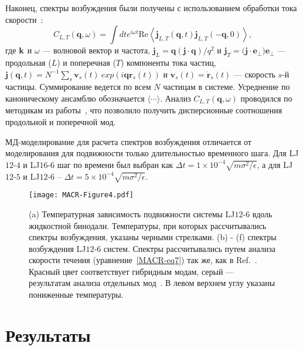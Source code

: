 Наконец, спектры возбуждения были получены с использованием обработки тока скорости~\cite{10.1063/1.5050708}:
\begin{equation}
    C_{L, T}(\mathbf{q}, \omega)=\int dt e^{i \omega t} \text{Re} \left\langle\mathbf{j}_{L, T}(\mathbf{q}, t) \mathbf{j}_{L, T}(-\mathbf{q}, 0)\right\rangle,
    \label{MACR-eq7}
\end{equation}
где ${\bf k}$ и $\omega$ — волновой вектор и частота,
$\mathbf{j}_{L}=\mathbf{q}(\mathbf{j} \cdot \mathbf{q} ) / q^{2}$ и $\mathbf{j}_{T}=(\mathbf{j \cdot e_{\perp})e_{\perp}}$ — продольная ($L$) и поперечная ($T$) компоненты тока частиц,\\
$\mathbf{j}(\mathbf{q}, t)=N^{-1} \sum_{s} \mathbf{v}_{s}(t) \ exp \left(i \mathbf{q} \mathbf{r}_{s}(t)\right)$ и $\mathbf{v}_{s}(t)=\dot{\mathbf{r} }_{s}(t)$ — скорость $s$-й частицы.
Суммирование ведется по всем $N$ частицам в системе.
Усреднение по каноническому ансамблю обозначается $\langle\cdots\rangle$. 
Анализ $C_{L, T}(\mathbf{q}, \omega)$ проводился по методикам из работы~\cite{10.1038/s41598-019-46979-y}, что позволило получить дисперсионные соотношения продольной и поперечной мод.

МД-моделирование для расчета спектров возбуждения отличается от моделирования для подвижности только длительностью временного шага. Для LJ$12$-$4$ и LJ$16$-$6$ шаг по времени был выбран как $\Delta t = 1 \times 10 ^ {-4} \sqrt {m \sigma ^ 2 / \epsilon}$, а для LJ$12$-$5$ и LJ$12$-$6$ -- $\Delta t = 5 \times 10 ^ {-4} \sqrt {m \sigma ^ 2 / \epsilon}$.

\begin{figure}[!t]
\centering
    \texttt{[image: MACR-Figure4.pdf]}
    \caption{(a) Температурная зависимость подвижности системы LJ$12$-$6$ вдоль жидкостной бинодали.
    Температуры, при которых рассчитывались спектры возбуждения, указаны черными стрелками.
    (b) - (f) спектры возбуждения LJ$12$-$6$ систем.
Спектры рассчитывались путем анализа скорости течения (уравнение~\eqref{MACR-eq7}) так же, как в Ref.~\cite{10.1038/s41598-019-46979-y}.
    Красный цвет соответствует гибридным модам, серый — результатам анализа отдельных мод~\cite{10.1038/s41598-019-46979-y}.
    В левом верхнем углу указаны пониженные температуры.}
\label{MACR-Figure4}
\end{figure}

\section{Результаты}
\label{MACR-SecResults}

